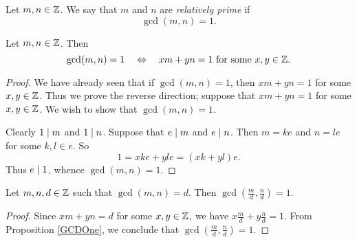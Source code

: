 \documentclass{amsart}
\begin{document}
\newpage

%

\begin{Def}
Let $m,n \in \mathbb{Z}$.  We say that $m$ and $n$ are {\em relatively prime} if
\[ \gcd(m,n) = 1 . \]
\end{Def}

\begin{Prop} \label{GCDOne}
Let $m,n \in \mathbb{Z}$.
Then
\[ \gcd(m,n) = 1 \quad \Leftrightarrow \quad xm + yn = 1 \text{ for some $x,y \in \mathbb{Z}$} . \]
\end{Prop}

\begin{proof}
We have already seen that if $\gcd(m,n) = 1$, then $xm + yn = 1$ for some $x,y \in \mathbb{Z}$.
Thus we prove the reverse direction; suppose that $xm + yn = 1$ for some $x,y \in \mathbb{Z}$.
We wish to show that $\gcd(m,n) = 1$.

Clearly $1 \mid m$ and $1 \mid n$.
Suppose that $e \mid m$ and $e \mid n$.
Then $m = ke$ and $n = le$ for some $k,l \in e$.
So
\[ 1 = xke + yle = (xk+yl)e. \]
Thus $e \mid 1$, whence $\gcd(m,n) = 1$.
\end{proof}


\begin{Prop}
Let $m,n,d \in \mathbb{Z}$ such that $\gcd(m,n) = d$.  Then $\gcd(\frac{m}{d},\frac{n}{d}) = 1$.
\end{Prop}

\begin{proof}
Since $xm + yn = d$ for some $x,y \in \mathbb{Z}$, we have $x\frac{m}{d} + y\frac{n}{d} = 1$.
From Proposition \ref{GCDOne},
we conclude that $\gcd(\frac{m}{d},\frac{n}{d}) = 1$.
\end{proof}
\end{document}
